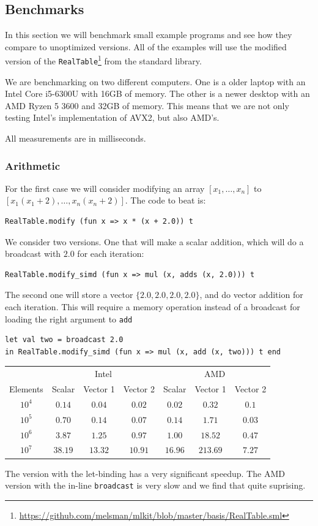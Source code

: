 \documentclass{article}
\begin{document}
\subsection{Benchmarks}

In this section we will benchmark small example programs and see how they compare to unoptimized versions. All of the examples will use the modified version of the \texttt{RealTable}\footnote{\url{https://github.com/melsman/mlkit/blob/master/basis/RealTable.sml}} from the standard library.
 
We are benchmarking on two different computers. One is a older laptop with an Intel Core i5-6300U with 16GB of memory. The other is a newer desktop with an AMD Ryzen 5 3600 and 32GB of memory. This means that we are not only testing Intel's implementation of AVX2, but also AMD's.

All measurements are in milliseconds.

\subsubsection{Arithmetic}

For the first case we will consider modifying an array $[x_1, \ldots, x_n]$ to $[x_1(x_1 + 2), \ldots, x_n(x_n + 2)]$. The code to beat is:
\begin{verbatim}
RealTable.modify (fun x => x * (x + 2.0)) t
\end{verbatim}
We consider two versions. One that will make a scalar addition, which will do a broadcast with $2.0$ for each iteration:
\begin{verbatim}
RealTable.modify_simd (fun x => mul (x, adds (x, 2.0))) t
\end{verbatim}
The second one will store a vector $\{ 2.0, 2.0, 2.0, 2.0 \}$, and do vector addition for each iteration. This will require a memory operation instead of a broadcast for loading the right argument to \verb!add!
\begin{verbatim}
let val two = broadcast 2.0
in RealTable.modify_simd (fun x => mul (x, add (x, two))) t end
\end{verbatim}
\begin{center}
\begin{tabular}{c c c c c c c}
    \toprule
    & \multicolumn{3}{c}{Intel} & \multicolumn{3}{c}{AMD} \\
    Elements & Scalar & Vector 1 & Vector 2 & Scalar & Vector 1 & Vector 2 \\
    \midrule
    $10^4$ & $0.14$ & $0.04$ & $0.02$ & $0.02$ & $0.32$ & $0.1$ \\
    $10^5$ & $0.70$ & $0.14$ & $0.07$ & $0.14$ & $1.71$ & $0.03$ \\
    $10^6$ & $3.87$ & $1.25$ & $0.97$ & $1.00$ & $18.52$ & $0.47$ \\
    $10^7$ & $38.19$ & $13.32$ & $10.91$ & $16.96$ & $213.69$ & $7.27$ \\
    \bottomrule
\end{tabular}
\end{center}
The version with the let-binding has a very significant speedup. The AMD version with the in-line \verb!broadcast! is very slow and we find that quite suprising.
\end{document}
